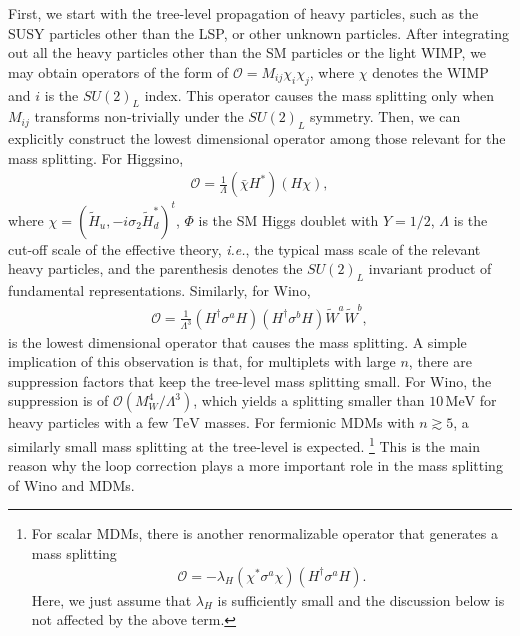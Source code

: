 \documentclass[12pt,twoside,book]{article}
\begin{document}
First, we start with the tree-level propagation of heavy particles, such as the SUSY particles other than the LSP, or other unknown particles.
After integrating out all the heavy particles other than the SM particles or the light WIMP, we may obtain operators of the form of $\mathcal{O} = M_{i j} \chi_i \chi_j$, where $\chi$ denotes the WIMP and $i$ is the $SU(2)_L$ index.
This operator causes the mass splitting only when $M_{i j}$ transforms non-trivially under the $SU(2)_L$ symmetry.
Then, we can explicitly construct the lowest dimensional operator among those relevant for the mass splitting.
For Higgsino,
\begin{align}
  \mathcal{O} = \frac{1}{\Lambda} (\bar{\chi} H^{*}) (H \chi),
  \label{eq:Higgsino_mass_splitting}
\end{align}
where $\chi = (\tilde{H}_u, -i \sigma_2 \tilde{H}_d^{*})^t$, $\Phi$ is the SM Higgs doublet with $Y = 1/2$, $\Lambda$ is the cut-off scale of the effective theory, \textit{i.e.}, the typical mass scale of the relevant heavy particles, and the parenthesis denotes the $SU(2)_L$ invariant product of fundamental representations.
Similarly, for Wino, \cite{Gherghetta:1999sw}
\begin{align}
  \mathcal{O} = \frac{1}{\Lambda^3} (H^\dagger \sigma^a H) (H^\dagger \sigma^b H) \tilde{W}^a \tilde{W}^b,
  \label{eq:Wino_mass_splitting}
\end{align}
is the lowest dimensional operator that causes the mass splitting.
A simple implication of this observation is that, for multiplets with large $n$, there are suppression factors that keep the tree-level mass splitting small.
For Wino, the suppression is of $\mathcal{O} (M_W^4 / \Lambda^3)$, which yields a splitting smaller than $10\,\mathrm{MeV}$ for heavy particles with a few $\mathrm{TeV}$ masses.
For fermionic MDMs with $n \gtrsim 5$, a similarly small mass splitting at the tree-level is expected.
\footnote{
  For scalar MDMs, there is another renormalizable operator that generates a mass splitting
  \begin{align*}
    \mathcal{O} = - \lambda_H \left( \chi^{*} \sigma^a \chi \right) \left( H^\dagger \sigma^a H \right).
  \end{align*}
  Here, we just assume that $\lambda_H$ is sufficiently small and the discussion below is not affected by the above term.
}
This is the main reason why the loop correction plays a more important role in the mass splitting of Wino and MDMs.
\end{document}

